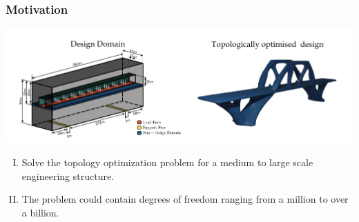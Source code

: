 \label{intro}
\begin{frame}\frametitle{Motivation}
\centering
    \includegraphics[width = 148mm]{slides/images/1.pdf}
    \begin{enumerate} [(I)]
        \item Solve the topology optimization problem for a medium to large scale engineering structure.
        \item The problem could contain degrees of freedom ranging from a million to over a billion.
  \end{enumerate}
\end{frame}
